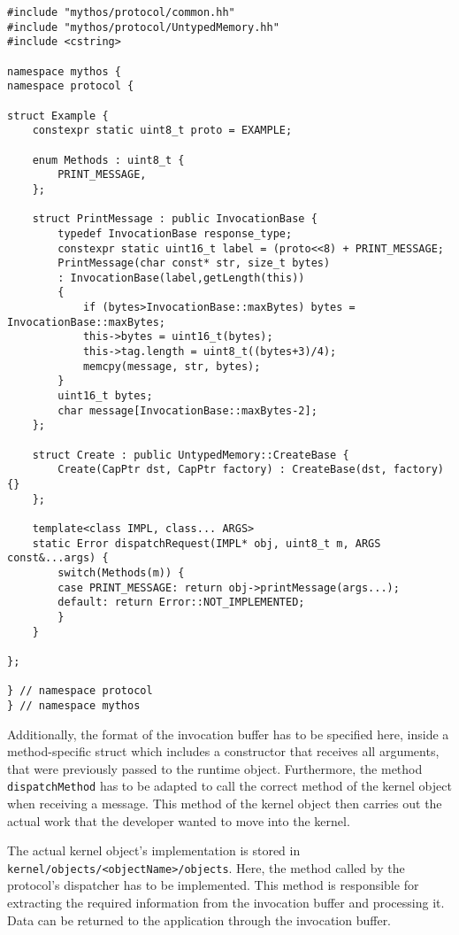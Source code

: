 \lstset{language=c++,caption=Object's Protocol Definition,label=lst:obj-protocol}
\begin{lstlisting}
#include "mythos/protocol/common.hh"
#include "mythos/protocol/UntypedMemory.hh"
#include <cstring>

namespace mythos {
namespace protocol {

struct Example {
	constexpr static uint8_t proto = EXAMPLE;

	enum Methods : uint8_t {
		PRINT_MESSAGE,
	};

	struct PrintMessage : public InvocationBase {
		typedef InvocationBase response_type;
		constexpr static uint16_t label = (proto<<8) + PRINT_MESSAGE;
		PrintMessage(char const* str, size_t bytes)
		: InvocationBase(label,getLength(this))
		{
			if (bytes>InvocationBase::maxBytes) bytes = InvocationBase::maxBytes;
			this->bytes = uint16_t(bytes);
			this->tag.length = uint8_t((bytes+3)/4);
			memcpy(message, str, bytes);
		}
		uint16_t bytes;
		char message[InvocationBase::maxBytes-2];
	};

	struct Create : public UntypedMemory::CreateBase {
		Create(CapPtr dst, CapPtr factory) : CreateBase(dst, factory) {}
	};

	template<class IMPL, class... ARGS>
	static Error dispatchRequest(IMPL* obj, uint8_t m, ARGS const&...args) {
		switch(Methods(m)) {
		case PRINT_MESSAGE: return obj->printMessage(args...);
		default: return Error::NOT_IMPLEMENTED;
		}
	}

};

} // namespace protocol
} // namespace mythos
\end{lstlisting}


Additionally, the format of the invocation buffer has to be specified here,
inside a method-specific struct which includes a constructor that receives all
arguments, that were previously passed to the runtime object.  Furthermore, the
method \texttt{dispatchMethod} has to be adapted to call the correct method of
the kernel object when receiving a message. This method of the kernel object
then carries out the actual work that the developer wanted to move into the
kernel.

The actual kernel object's implementation is stored in
\\\texttt{kernel/objects/<objectName>/objects}. Here, the method called by the
protocol's dispatcher has to be implemented. This method is responsible for
extracting the required information from the invocation buffer and processing
it. Data can be returned to the application through the invocation buffer.

% 
% 


